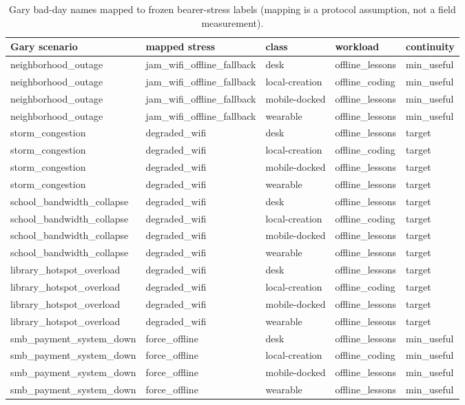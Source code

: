 \begin{table}[h]
\centering
\caption{Gary bad-day names mapped to frozen bearer-stress labels (mapping is a protocol assumption, not a field measurement).}
\begin{tabular}{lllll}\toprule
Gary scenario & mapped stress & class & workload & continuity \\\midrule
neighborhood\_outage & jam\_wifi\_offline\_fallback & desk & offline\_lessons & min\_useful \\
neighborhood\_outage & jam\_wifi\_offline\_fallback & local-creation & offline\_coding & min\_useful \\
neighborhood\_outage & jam\_wifi\_offline\_fallback & mobile-docked & offline\_lessons & min\_useful \\
neighborhood\_outage & jam\_wifi\_offline\_fallback & wearable & offline\_lessons & min\_useful \\
storm\_congestion & degraded\_wifi & desk & offline\_lessons & target \\
storm\_congestion & degraded\_wifi & local-creation & offline\_coding & target \\
storm\_congestion & degraded\_wifi & mobile-docked & offline\_lessons & target \\
storm\_congestion & degraded\_wifi & wearable & offline\_lessons & target \\
school\_bandwidth\_collapse & degraded\_wifi & desk & offline\_lessons & target \\
school\_bandwidth\_collapse & degraded\_wifi & local-creation & offline\_coding & target \\
school\_bandwidth\_collapse & degraded\_wifi & mobile-docked & offline\_lessons & target \\
school\_bandwidth\_collapse & degraded\_wifi & wearable & offline\_lessons & target \\
library\_hotspot\_overload & degraded\_wifi & desk & offline\_lessons & target \\
library\_hotspot\_overload & degraded\_wifi & local-creation & offline\_coding & target \\
library\_hotspot\_overload & degraded\_wifi & mobile-docked & offline\_lessons & target \\
library\_hotspot\_overload & degraded\_wifi & wearable & offline\_lessons & target \\
smb\_payment\_system\_down & force\_offline & desk & offline\_lessons & min\_useful \\
smb\_payment\_system\_down & force\_offline & local-creation & offline\_coding & min\_useful \\
smb\_payment\_system\_down & force\_offline & mobile-docked & offline\_lessons & min\_useful \\
smb\_payment\_system\_down & force\_offline & wearable & offline\_lessons & min\_useful \\
\bottomrule\end{tabular}
\end{table}
